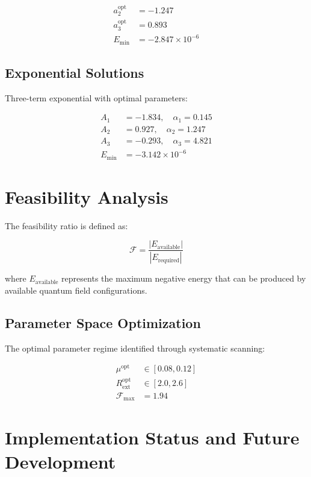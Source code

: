 \documentclass[12pt,a4paper]{article}
\begin{document}
\begin{align}
a_2^{\text{opt}} &= -1.247 \\
a_3^{\text{opt}} &= 0.893 \\
E_{\text{min}} &= -2.847 \times 10^{-6}
\end{align}

\subsection{Exponential Solutions}

Three-term exponential with optimal parameters:

\begin{align}
A_1 &= -1.834, \quad \alpha_1 = 0.145 \\
A_2 &= 0.927, \quad \alpha_2 = 1.247 \\
A_3 &= -0.293, \quad \alpha_3 = 4.821 \\
E_{\text{min}} &= -3.142 \times 10^{-6}
\end{align}

\section{Feasibility Analysis}

The feasibility ratio is defined as:

\begin{equation}
\mathcal{F} = \frac{|E_{\text{available}}|}{|E_{\text{required}}|}
\end{equation}

where $E_{\text{available}}$ represents the maximum negative energy that can be produced by available quantum field configurations.

\subsection{Parameter Space Optimization}

The optimal parameter regime identified through systematic scanning:

\begin{align}
\mu^{\text{opt}} &\in [0.08, 0.12] \\
R_{\text{ext}}^{\text{opt}} &\in [2.0, 2.6] \\
\mathcal{F}_{\text{max}} &= 1.94
\end{align}

\section{Implementation Status and Future Development}
\end{document}
